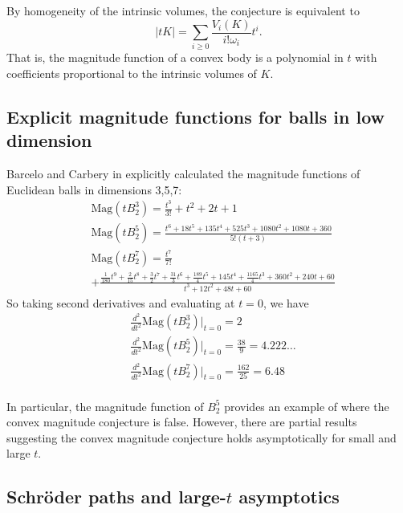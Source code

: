 \documentclass[11pt]{article}
\theoremstyle{mythm}
\begin{document}
By homogeneity of the intrinsic volumes, the conjecture is equivalent to
\begin{equation*}
\vert tK \vert = \sum\limits_{i\geq0}\frac{V_i(K)}{i!\omega_i}t^i.
\end{equation*}
That is, the magnitude function of a convex body is a polynomial in $t$ with coefficients proportional to the intrinsic volumes of $K$.

\subsection{Explicit magnitude functions for balls in low dimension}

Barcelo and Carbery in \cite{barcelo_magnitudes_2016} explicitly calculated the magnitude functions of Euclidean balls in dimensions 3,5,7:
\begin{align*}
&\text{Mag}(tB_2^3) = \frac{t^3}{3!}+t^2+2t+1 \\
&\text{Mag}(tB_2^5) = \frac{t^6+18t^5+135t^4+525t^3+1080t^2+1080t+360}{5!(t+3)} \\
&\text{Mag}(tB_2^7) = \frac{t^7}{7!} \\
&+ \frac{\frac{1}{180}t^9+\frac{2}{15}t^8+\frac{3}{2}t^7+\frac{31}{3}t^6+\frac{189}{4}t^5+145t^4+\frac{1165}{4}t^3+360t^2+240t+60}{t^3+12t^2+48t+60}
\end{align*}
So taking second derivatives and evaluating at $t = 0$, we have
\begin{align*}
&\frac{d^2}{dt^2}\text{Mag}(tB_2^3)\big\vert_{t=0} = 2 \\
&\frac{d^2}{dt^2}\text{Mag}(tB_2^5)\big\vert_{t=0} = \frac{38}{9} = 4.222\dots \\
&\frac{d^2}{dt^2}\text{Mag}(tB_2^7)\big\vert_{t=0} = \frac{162}{25} = 6.48 \\
\end{align*}

In particular, the magnitude function of $B_2^5$ provides an example of where the convex magnitude conjecture is false. However, there are partial results suggesting the convex magnitude conjecture holds asymptotically for small and large $t$.

\subsection{Schröder paths and large-$t$ asymptotics}
\end{document}

